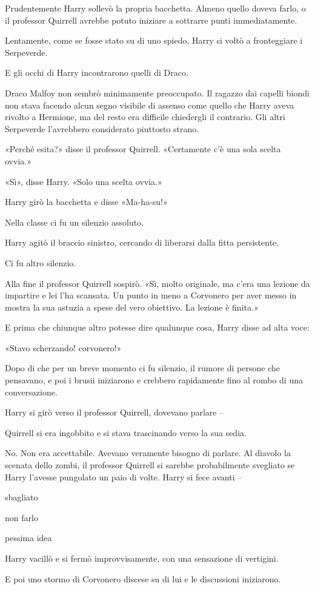 Prudentemente Harry sollevò la propria bacchetta. Almeno quello doveva farlo, o il professor Quirrell avrebbe potuto iniziare a sottrarre punti immediatamente.

Lentamente, come se fosse stato su di uno spiedo, Harry si voltò a fronteggiare i Serpeverde.

E gli occhi di Harry incontrarono quelli di Draco.

Draco Malfoy non sembrò minimamente preoccupato. Il ragazzo dai capelli biondi non stava facendo alcun segno visibile di assenso come quello che Harry aveva rivolto a Hermione, ma del resto era difficile chiedergli il contrario. Gli altri Serpeverde l’avrebbero considerato piuttosto strano.

«Perché esita?» disse il professor Quirrell. «Certamente c’è una sola scelta ovvia.»

«Sì», disse Harry. «Solo una scelta ovvia.»

Harry girò la bacchetta e disse «Ma-ha-su!»

Nella classe ci fu un silenzio assoluto.

Harry agitò il braccio sinistro, cercando di liberarsi dalla fitta persistente.

Ci fu altro silenzio.

Alla fine il professor Quirrell sospirò. «Sì, molto originale, ma c’era una lezione da impartire e lei l’ha scansata. Un punto in meno a Corvonero per aver messo in mostra la sua astuzia a spese del vero obiettivo. La lezione è finita.»

E prima che chiunque altro potesse dire qualunque cosa, Harry disse ad alta voce:

«Stavo scherzando! corvonero!»

Dopo di che per un breve momento ci fu silenzio, il rumore di persone che pensavano, e poi i brusii iniziarono e crebbero rapidamente fino al rombo di una conversazione.

Harry si girò verso il professor Quirrell, dovevano parlare –

Quirrell si era ingobbito e si stava trascinando verso la sua sedia.

No. Non era accettabile. Avevano veramente bisogno di parlare. Al diavolo la scenata dello zombi, il professor Quirrell si sarebbe probabilmente svegliato se Harry l’avesse pungolato un paio di volte. Harry si fece avanti –

sbagliato

non farlo

pessima idea

Harry vacillò e si fermò improvvisamente, con una sensazione di vertigini.

E poi uno stormo di Corvonero discese su di lui e le discussioni iniziarono.



